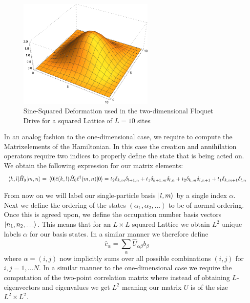 \documentclass[11pt, a4paper]{article}
\theoremstyle{definition} %
\begin{document}
	\begin{figure}[h]	
		\centering
		\includegraphics[width=0.6\textwidth]{chart2}
		\caption{Sine-Squared Deformation used in the two-dimensional Floquet Drive for a squared Lattice of $L=10$ sites}
	\end{figure}
	
	In an analog fashion to the one-dimensional case, we require to compute the Matrixelements of the Hamiltonian. In this case the creation and annihilation operators require two indices to properly define the state that is being acted on. We obtain the following expression for our matrix elements:
	\begin{equation}
		\mel{k,l}{\hat{H}_0}{m,n} = \mel{0}{\hat{c}(k,l)\hat{H}_0\hat{c}^\dagger(m,n)}{0} = t_2 \delta_{k,m}\delta_{l+1,n} + t_1 \delta_{k+1,m} \delta_{l,n} + t_2 \delta_{k,m} \delta_{l, n+1} + t_1 \delta_{k, m+1} \delta_{l,n}
	\end{equation}
	
	From now on we will label our single-particle basis $\ket{l,m}$ by a single index $\alpha$. Next we define the ordering of the states $(\alpha_1, \alpha_2, \dots)$ to be of normal ordering. Once this is agreed upon, we define the occupation number basis vectors $\ket{n_1, n_2, \dots}$. This means that for an $L \times L$ squared Lattice we obtain $L^2$ unique labels $\alpha$ for our basis states. In a similar manner we therefore define
	\begin{equation}
		\hat{c}_\alpha = \sum_\alpha \hat{U}_{\alpha \beta} b_\beta
	\end{equation}
	where $\alpha = (i,j)$ now implicitly sums over all possible combinations $(i,j)$ for $ i,j = 1, \dots N$. In a similar manner to the one-dimensional case we require the computation of the two-point correlation matrix where instead of obtaining $L$-eigenvectors and eigenvalues we get $L^2$ meaning our matrix $U$ is of the size $L^2 \times L^2$. \\
	
\end{document}
